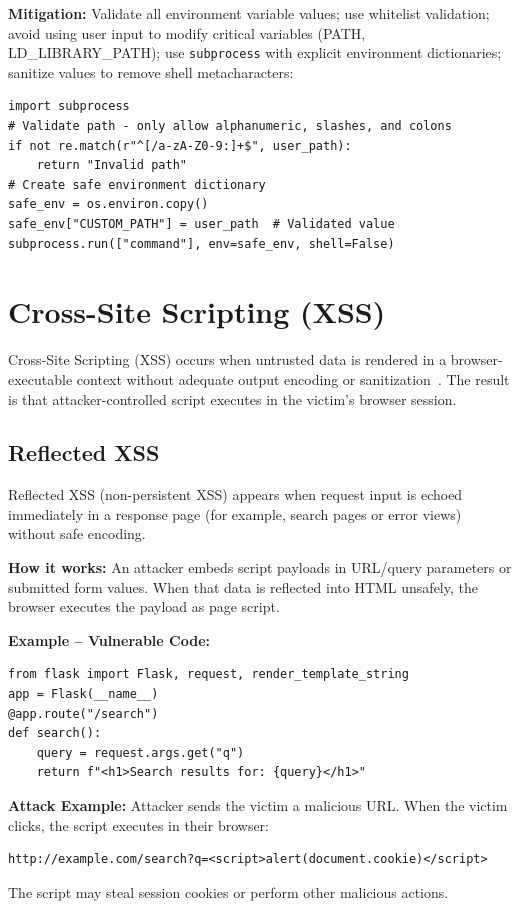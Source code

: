\textbf{Mitigation:} Validate all environment variable values; use whitelist validation; avoid using user input to modify critical variables (PATH, LD\_LIBRARY\_PATH); use \texttt{subprocess} with explicit environment dictionaries; sanitize values to remove shell metacharacters:

\begin{lstlisting}[style=pycode]
import subprocess
# Validate path - only allow alphanumeric, slashes, and colons
if not re.match(r"^[/a-zA-Z0-9:]+$", user_path):
    return "Invalid path"
# Create safe environment dictionary
safe_env = os.environ.copy()
safe_env["CUSTOM_PATH"] = user_path  # Validated value
subprocess.run(["command"], env=safe_env, shell=False)
\end{lstlisting}

\section{Cross-Site Scripting (XSS)}
\label{sec:background_xss}

Cross-Site Scripting (XSS) occurs when untrusted data is rendered in a browser-executable context without adequate output encoding or sanitization~\cite{OWASPTop10,OWASPXSSCheatsheet,CWE79,MDNCSP,XSSRef1}. The result is that attacker-controlled script executes in the victim's browser session.

\subsection{Reflected XSS}
\label{sec:xss_reflected}

Reflected XSS (non-persistent XSS) appears when request input is echoed immediately in a response page (for example, search pages or error views) without safe encoding.

\textbf{How it works:} An attacker embeds script payloads in URL/query parameters or submitted form values. When that data is reflected into HTML unsafely, the browser executes the payload as page script.

\textbf{Example -- Vulnerable Code:}

\begin{lstlisting}[style=pycode]
from flask import Flask, request, render_template_string
app = Flask(__name__)
@app.route("/search")
def search():
    query = request.args.get("q")
    return f"<h1>Search results for: {query}</h1>"
\end{lstlisting}

\textbf{Attack Example:} Attacker sends the victim a malicious URL. When the victim clicks, the script executes in their browser:
\begin{lstlisting}[style=attackcode]
http://example.com/search?q=<script>alert(document.cookie)</script>
\end{lstlisting}
The script may steal session cookies or perform other malicious actions.

